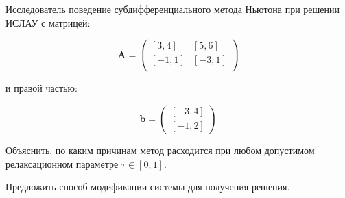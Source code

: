 Исследователь поведение субдифференциального метода Ньютона при решении ИСЛАУ с матрицей:

\begin{equation}
    \mathbf{A}=
    \begin{pmatrix}
    [3, 4] & [5, 6] \\
    [-1, 1	] & [-3, 1] \\
    \end{pmatrix}
\end{equation}

и правой частью:

\begin{equation}
\mathbf{b}=
\begin{pmatrix}
[-3, 4] \\
[-1, 2]
\end{pmatrix}
\end{equation}

Объяснить, по каким причинам метод расходится при любом допустимом релаксационном параметре $\tau \in [0; 1]$.

Предложить способ модификации системы для получения решения.